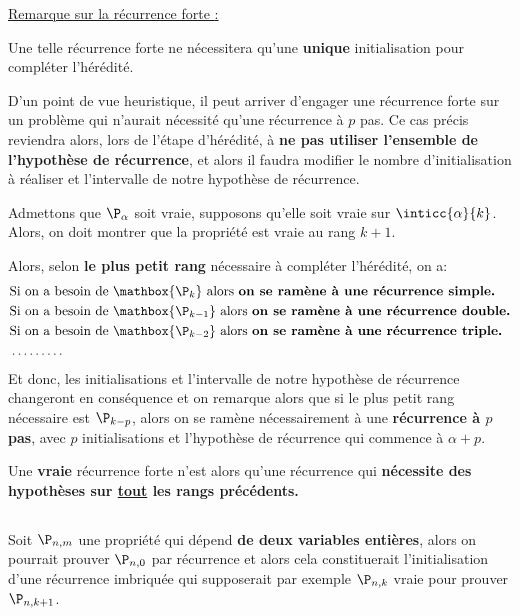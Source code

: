 \underline{Remarque sur la récurrence forte {:}}\<

Une telle récurrence forte ne nécessitera qu'une \textbf{unique} initialisation pour compléter l'hérédité.\<

D'un point de vue heuristique, il peut arriver d'engager une récurrence forte sur un problème qui n'aurait nécessité qu'une récurrence à \(p\) pas.\+
Ce cas précis reviendra alors, lors de l'étape d'hérédité, à \textbf{ne pas utiliser l'ensemble de l'hypothèse de récurrence}, et alors il faudra modifier le nombre d'initialisation à réaliser et l'intervalle de notre hypothèse de récurrence.\<

Admettons que \(\P_\alpha\) soit vraie, supposons qu'elle soit vraie sur \(\inticc{\alpha}{k}\). Alors, on doit montrer que la propriété est vraie au rang \(k + 1\).\<

Alors, selon \textbf{le plus petit rang} nécessaire à compléter l'hérédité, on a:
\begin{align*}
    & \text{Si on a besoin de } {\mathbox{\P_k}} \text{ alors \textbf{on se ramène à une récurrence simple.}}\\
    & \text{Si on a besoin de } {\mathbox{\P_{k-1}}} \text{ alors \textbf{on se ramène à une récurrence double.}}\\
    & \text{Si on a besoin de } {\mathbox{\P_{k-2}}} \text{ alors \textbf{on se ramène à une récurrence triple.}}\\
    & \ldots\ldots\ldots
\end{align*}
Et donc, les initialisations et l'intervalle de notre hypothèse de récurrence changeront en conséquence et on remarque alors que si le plus petit rang nécessaire est \(\P_{k-p}\), alors on se ramène nécessairement à une \textbf{récurrence à \(p\) pas}, avec \(p\) initialisations et l'hypothèse de récurrence qui commence à \(\alpha + p\).\<

Une \textbf{vraie} récurrence forte n'est alors qu'une récurrence qui \textbf{nécessite des hypothèses sur \underline{tout} les rangs précédents.}
   
\subsection*{}
Soit \(\P_{n,m}\) une propriété qui dépend \textbf{de deux variables entières}, alors on pourrait prouver \(\P_{n, 0}\) par récurrence et alors cela constituerait l'initialisation d'une récurrence imbriquée qui supposerait par exemple \(\P_{n, k}\) vraie pour prouver \(\P_{n, k+1}\).

